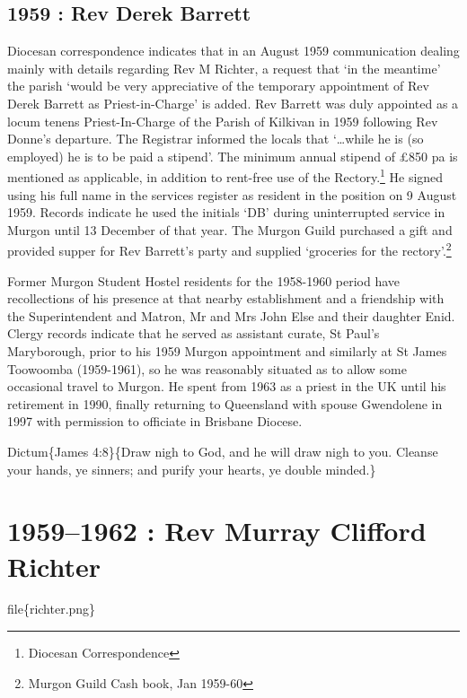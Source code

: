 \hypertarget{rev-derek-barrett}{%
\section{1959 : Rev Derek Barrett}\label{rev-derek-barrett}}

Diocesan correspondence indicates that in an August 1959 communication dealing mainly with details regarding Rev M Richter, a request that `in the meantime' the parish `would be very appreciative of the temporary appointment of Rev Derek Barrett as Priest-in-Charge' is added. Rev Barrett was duly appointed as a locum tenens Priest-In-Charge of the Parish of Kilkivan in 1959 following Rev Donne's departure. The Registrar informed the locals that `\ldots while he is (so employed) he is to be paid a stipend'. The minimum annual stipend of £850 pa is mentioned as applicable, in addition to rent-free use of the Rectory.\footnote{Diocesan Correspondence} He signed using his full name in the services register as resident in the position on 9 August 1959. Records indicate he used the initials `DB' during uninterrupted service in Murgon until 13 December of that year. The Murgon Guild purchased a gift and provided supper for Rev Barrett's party and supplied `groceries for the rectory'.\footnote{Murgon Guild Cash book, Jan 1959-60}

Former Murgon Student Hostel residents for the 1958-1960 period have recollections of his presence at that nearby establishment and a friendship with the Superintendent and Matron, Mr and Mrs John Else and their daughter Enid. Clergy records indicate that he served as assistant curate, St Paul's Maryborough, prior to his 1959 Murgon appointment and similarly at St James Toowoomba (1959-1961), so he was reasonably situated as to allow some occasional travel to Murgon. He spent from 1963 as a priest in the UK until his retirement in 1990, finally returning to Queensland with spouse Gwendolene in 1997 with permission to officiate in Brisbane Diocese.

Dictum\{James 4:8\}\{Draw nigh to God, and he will draw nigh to you. Cleanse your hands, ye sinners; and purify your hearts, ye double minded.\}

\hypertarget{rev-murray-clifford-richter}{%
\chapter{1959--1962 : Rev Murray Clifford Richter}\label{rev-murray-clifford-richter}}

file\{richter.png\}

